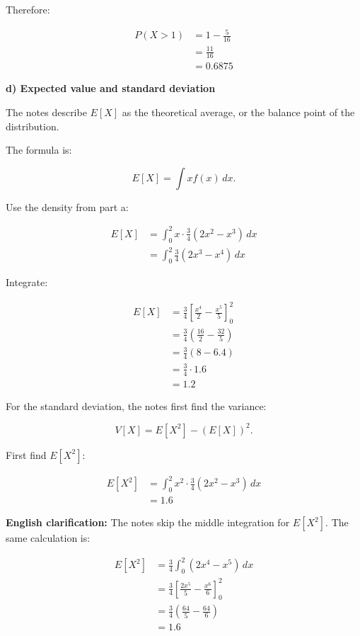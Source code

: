 \documentclass[10pt]{article}
\begin{document}
Therefore:

\begin{align*}
P(X>1)
&=1-\frac{5}{16} \\[2mm]
&=\frac{11}{16} \\[2mm]
&=0.6875
\end{align*}

\textbf{d) Expected value and standard deviation}

The notes describe $E[X]$ as the theoretical average,
or the balance point of the distribution.

The formula is:

\[
E[X]=\int x f(x)\,dx.
\]

Use the density from part a:

\begin{align*}
E[X]
&=
\int_0^2
x\cdot \frac{3}{4}
\left(2x^2-x^3\right)\,dx \\[2mm]
&=
\int_0^2
\frac{3}{4}
\left(2x^3-x^4\right)\,dx
\end{align*}

Integrate:

\begin{align*}
E[X]
&=
\frac{3}{4}
\left[
\frac{x^4}{2}
-\frac{x^5}{5}
\right]_0^2 \\[2mm]
&=
\frac{3}{4}
\left(
\frac{16}{2}
-\frac{32}{5}
\right) \\[2mm]
&=
\frac{3}{4}(8-6.4) \\[2mm]
&=
\frac{3}{4}\cdot 1.6 \\[2mm]
&=1.2
\end{align*}

For the standard deviation, the notes first find
the variance:

\[
V[X]=E[X^2]-(E[X])^2.
\]

First find $E[X^2]$:

\begin{align*}
E[X^2]
&=
\int_0^2
x^2\cdot
\frac{3}{4}(2x^2-x^3)\,dx \\[2mm]
&=1.6
\end{align*}

\textbf{English clarification:}
The notes skip the middle integration for $E[X^2]$.
The same calculation is:

\begin{align*}
E[X^2]
&=
\frac{3}{4}
\int_0^2
(2x^4-x^5)\,dx \\[2mm]
&=
\frac{3}{4}
\left[
\frac{2x^5}{5}
-\frac{x^6}{6}
\right]_0^2 \\[2mm]
&=
\frac{3}{4}
\left(
\frac{64}{5}
-\frac{64}{6}
\right) \\[2mm]
&=1.6
\end{align*}
\end{document}
